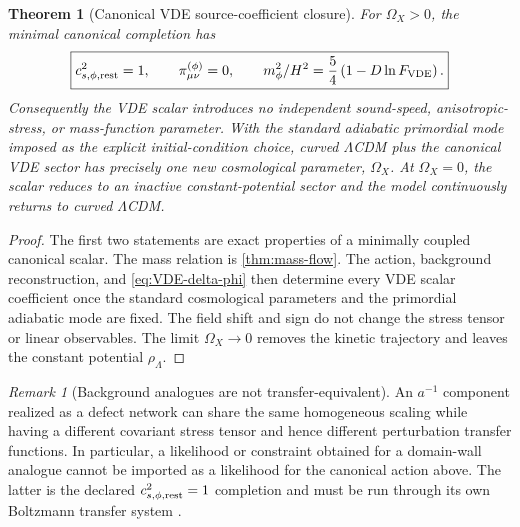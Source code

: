 \documentclass[11pt,a4paper]{article}
\def\Dil{D}%
\numberwithin{equation}{section}
\theoremstyle{definition}
\theoremstyle{plain}
\newtheorem{theorem}[criterion]{Theorem}
\theoremstyle{remark}
\newtheorem{remark}[criterion]{Remark}
\newcommand{\Dil}{\mathscr{D}}
\begin{document}
\begin{theorem}[Canonical VDE source-coefficient closure]
\label{thm:no-free-transfer}
For $\Omega_X>0$, the minimal canonical completion has
\begin{equation}
\boxed{
c_{s,\phi,\rm rest}^2=1,
\qquad
\pi^{(\phi)}_{\mu\nu}=0,
\qquad
m_\phi^2/H^2=\frac54\left(1-\Dil\ln F_{\rm VDE}\right).}
\end{equation}
Consequently the VDE scalar introduces no independent sound-speed,
anisotropic-stress, or mass-function parameter.  With the standard adiabatic
primordial mode imposed as the explicit initial-condition choice, curved
$\Lambda$CDM plus the canonical VDE sector has precisely one new cosmological
parameter, $\Omega_X$.  At $\Omega_X=0$, the scalar reduces to an inactive
constant-potential sector and the model continuously returns to curved
$\Lambda$CDM.
\end{theorem}

\begin{proof}
The first two statements are exact properties of a minimally coupled canonical
scalar.  The mass relation is \cref{thm:mass-flow}.  The action, background
reconstruction, and \cref{eq:VDE-delta-phi} then determine every VDE scalar
coefficient once the standard cosmological parameters and the primordial
adiabatic mode are fixed.  The field shift and sign do not change the stress
tensor or linear observables.  The limit $\Omega_X\to0$ removes the kinetic
trajectory and leaves the constant potential $\rho_\Lambda$.
\end{proof}

\begin{remark}[Background analogues are not transfer-equivalent]
An $a^{-1}$ component realized as a defect network can share the same
homogeneous scaling while having a different covariant stress tensor and hence
different perturbation transfer functions.  In particular, a likelihood or
constraint obtained for a domain-wall analogue cannot be imported as a
likelihood for the canonical action above.  The latter is the declared
$c_{s,\phi,\rm rest}^2=1$ completion and must be run through its own Boltzmann
transfer system \cite{AnHanZhang2025}.
\end{remark}
\end{document}
